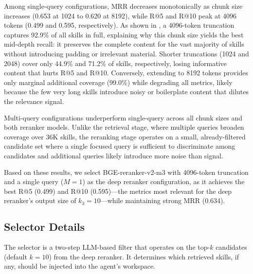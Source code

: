 \documentclass[11pt]{article}
\begin{document}
Among single-query configurations, MRR decreases monotonically as chunk size increases (0.653 at 1024 to 0.620 at 8192), while R@5 and R@10 peak at 4096 tokens (0.499 and 0.595, respectively).
As shown in , a 4096-token truncation captures 92.9\% of all skills in full, explaining why this chunk size yields the best mid-depth recall: it preserves the complete content for the vast majority of skills without introducing padding or irrelevant material.
Shorter truncations (1024 and 2048) cover only 44.9\% and 71.2\% of skills, respectively, losing informative content that hurts R@5 and R@10.
Conversely, extending to 8192 tokens provides only marginal additional coverage (99.0\%) while degrading all metrics, likely because the few very long skills introduce noisy or boilerplate content that dilutes the relevance signal.

Multi-query configurations underperform single-query across all chunk sizes and both reranker models.
Unlike the retrieval stage, where multiple queries broaden coverage over 36K skills, the reranking stage operates on a small, already-filtered candidate set where a single focused query is sufficient to discriminate among candidates and additional queries likely introduce more noise than signal.

Based on these results, we select BGE-reranker-v2-m3 with 4096-token truncation and a single query ($M = 1$) as the deep reranker configuration, as it achieves the best R@5 (0.499) and R@10 (0.595)---the metrics most relevant for the deep reranker's output size of $k_3 = 10$---while maintaining strong MRR (0.634).

\begin{table}[t]
  \centering
  \caption{Deep reranker configuration comparison (BGE-reranker-v2-m3) on the 100-candidate shallow reranker output.
  Chunk size denotes the token truncation length applied to skill content.
  Bold indicates best per column.
  All metrics are averaged across tasks.}
  \label{tab:deep_reranker_config}
  
\end{table}

\subsection{Selector Details}
\label{sec:selector_details}

The selector is a two-step LLM-based filter that operates on the top-$k$ candidates (default $k{=}10$) from the deep reranker.
It determines which retrieved skills, if any, should be injected into the agent's workspace.
\end{document}
